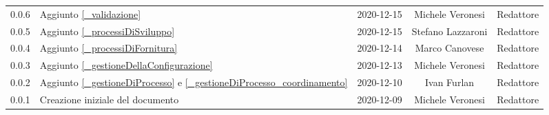 \begin{center}
\begin{longtable}{|c|p{5cm}|c|c|c|}
		0.0.6 & Aggiunto \ref{_validazione} & 2020-12-15 & Michele Veronesi & Redattore \\
		0.0.5 & Aggiunto \ref{_processiDiSviluppo} & 2020-12-15 & Stefano Lazzaroni & Redattore \\
		0.0.4 & Aggiunto \ref{_processiDiFornitura} & 2020-12-14 & Marco Canovese & Redattore \\
		0.0.3 & Aggiunto \ref{_gestioneDellaConfigurazione} & 2020-12-13 & Michele Veronesi & Redattore \\
		0.0.2 & Aggiunto \ref{_gestioneDiProcesso} e \ref{_gestioneDiProcesso_coordinamento} & 2020-12-10 & Ivan Furlan & Redattore \\
		0.0.1 & Creazione iniziale del documento & 2020-12-09 & Michele Veronesi & Redattore \\
		
		\hline
	\end{longtable}
\end{center}